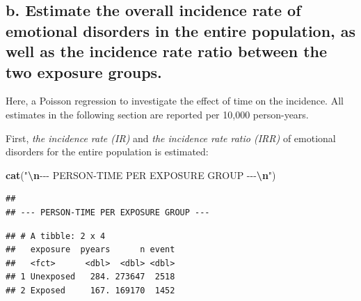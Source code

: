 \documentclass[
]{article}
\newenvironment{Shaded}{\begin{snugshade}}{\end{snugshade}}
\newcommand{\AttributeTok}[1]{\textcolor[rgb]{0.13,0.29,0.53}{#1}}
\newcommand{\ConstantTok}[1]{\textcolor[rgb]{0.56,0.35,0.01}{#1}}
\newcommand{\DecValTok}[1]{\textcolor[rgb]{0.00,0.00,0.81}{#1}}
\newcommand{\FunctionTok}[1]{\textcolor[rgb]{0.13,0.29,0.53}{\textbf{#1}}}
\newcommand{\NormalTok}[1]{#1}
\newcommand{\OtherTok}[1]{\textcolor[rgb]{0.56,0.35,0.01}{#1}}
\newcommand{\SpecialCharTok}[1]{\textcolor[rgb]{0.81,0.36,0.00}{\textbf{#1}}}
\newcommand{\StringTok}[1]{\textcolor[rgb]{0.31,0.60,0.02}{#1}}
\begin{document}
\subsection{b. Estimate the overall incidence rate of emotional
disorders in the entire population, as well as the incidence rate ratio
between the two exposure
groups.}\label{b.-estimate-the-overall-incidence-rate-of-emotional-disorders-in-the-entire-population-as-well-as-the-incidence-rate-ratio-between-the-two-exposure-groups.}

Here, a Poisson regression to investigate the effect of time on the
incidence. All estimates in the following section are reported per
10,000 person-years.

First, \emph{the incidence rate (IR)} and \emph{the incidence rate ratio
(IRR)} of emotional disorders for the entire population is estimated:

\begin{Shaded}
\begin{Highlighting}[]
\FunctionTok{cat}\NormalTok{(}\StringTok{"}\SpecialCharTok{\textbackslash{}n}\StringTok{{-}{-}{-} PERSON{-}TIME PER EXPOSURE GROUP {-}{-}{-}}\SpecialCharTok{\textbackslash{}n}\StringTok{"}\NormalTok{)}
\end{Highlighting}
\end{Shaded}

\begin{verbatim}
## 
## --- PERSON-TIME PER EXPOSURE GROUP ---
\end{verbatim}

\begin{Shaded}
\end{Shaded}

\begin{verbatim}
## # A tibble: 2 x 4
##   exposure  pyears      n event
##   <fct>      <dbl>  <dbl> <dbl>
## 1 Unexposed   284. 273647  2518
## 2 Exposed     167. 169170  1452
\end{verbatim}
\end{document}
